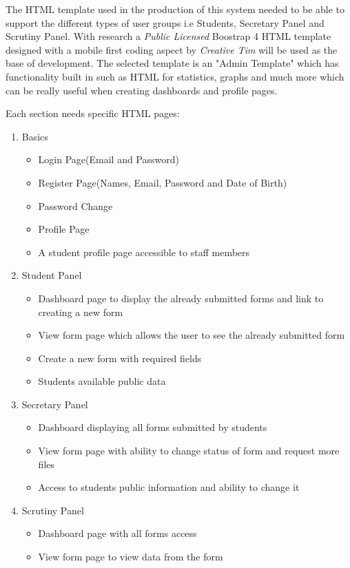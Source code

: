 \documentclass[../main.tex]{subfiles}
\begin{document}
\raggedright
The HTML template used in the production of this system needed to be able to support the different types of user groups i.e Students, Secretary Panel and Scrutiny Panel. With research a \textit{Public Licensed}\cite{creativeTimTemplateLicense} Boostrap 4\cite{bootstrapfour} HTML template\cite{creativeTimTemplate} designed with a mobile first coding aspect by \textit{Creative Tim} will be used as the base of development. The selected template is an "Admin Template" which has functionality built in such as HTML for statistics, graphs and much more which can be really useful when creating dashboards and profile pages. 

Each section needs specific HTML pages:

\begin{enumerate}
	\item Basics
		\begin{itemize}
     		\item Login Page(Email and Password)
     		\item Register Page(Names, Email, Password and Date of Birth)
     		\item Password Change
     		\item Profile Page
     		\item A student profile page accessible to staff members
   		\end{itemize}
   	\item Student Panel
   		\begin{itemize}
     		\item Dashboard page to display the already submitted forms and link to creating a new form
     		\item View form page which allows the user to see the already submitted form
     		\item Create a new form with required fields
     		\item Students available public data
   		\end{itemize}
   \item Secretary Panel
		\begin{itemize}
     		\item Dashboard displaying all forms submitted by students 
     		\item View form page with ability to change status of form and request more files
     		\item Access to students public information and ability to change it
   		\end{itemize}
   	\item Scrutiny Panel
		\begin{itemize}
     		\item Dashboard page with all forms access
     		\item View form page to view data from the form
   		\end{itemize}
\end{enumerate}
\end{document}
